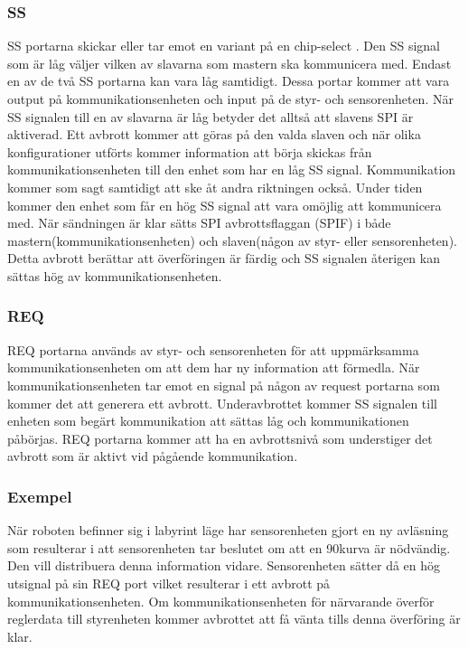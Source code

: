 \subsubsection{SS}
SS portarna skickar eller tar emot en variant på en chip-select . Den SS signal som är låg väljer vilken av slavarna som mastern ska kommunicera med. Endast en av de två SS portarna kan vara låg samtidigt. Dessa portar kommer att vara output på kommunikationsenheten och input på de styr- och sensorenheten.
När SS signalen till en av slavarna är låg betyder det alltså att slavens SPI är aktiverad. Ett avbrott kommer att göras på den valda slaven och när olika konfigurationer utförts kommer information att börja skickas från kommunikationsenheten till den enhet som har en låg SS signal. Kommunikation kommer som sagt samtidigt att ske åt andra riktningen också. Under tiden kommer den enhet som får en hög SS signal att vara omöjlig att kommunicera med.
När sändningen är klar sätts SPI avbrottsflaggan (SPIF) i både mastern(kommunikationsenheten) och slaven(någon av styr- eller sensorenheten). Detta avbrott berättar att överföringen är färdig och SS signalen återigen kan sättas hög av kommunikationsenheten.

\subsubsection{REQ}
REQ portarna används av styr- och sensorenheten för att uppmärksamma kommunikationsenheten om att dem har ny information att förmedla. När kommunikationsenheten tar emot en signal på någon av request portarna som kommer det att generera ett avbrott. Underavbrottet kommer SS signalen till enheten som begärt kommunikation att sättas låg och kommunikationen påbörjas.  REQ portarna kommer att ha en avbrottsnivå som understiger det avbrott som är aktivt vid pågående kommunikation.

\subsubsection{Exempel}

När roboten befinner sig i labyrint läge har sensorenheten gjort en ny avläsning som resulterar i att sensorenheten tar beslutet om att en 90\degree kurva är nödvändig. Den vill distribuera denna information vidare. Sensorenheten sätter då en hög utsignal på sin REQ port vilket resulterar i ett avbrott på kommunikationsenheten. Om kommunikationsenheten för närvarande överför reglerdata till styrenheten kommer avbrottet att få vänta tills denna överföring är klar.

